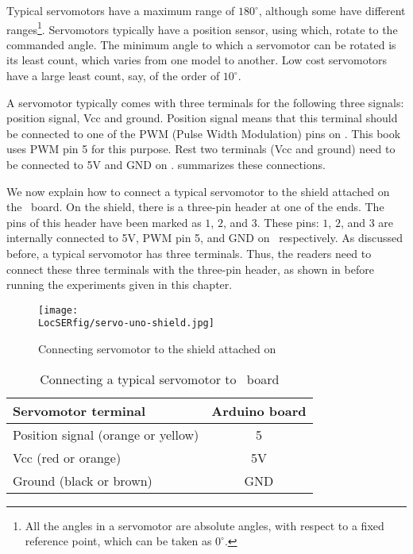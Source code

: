 Typical servomotors have a maximum range of $180^\circ$, although some
have different ranges\footnote{All the angles in a servomotor are
  absolute angles, with respect to a fixed reference point, which can
  be taken as $0^\circ$.}.
Servomotors typically have a position sensor,
using which, rotate to the commanded angle.  The minimum angle to
which a servomotor can be rotated is its least count, which varies
from one model to another.  Low cost servomotors have a large least
count, say, of the order of $10^\circ$.

A servomotor typically comes with three terminals for the
following three signals: position signal, Vcc and ground. 
Position signal means that this terminal should be connected to 
one of the PWM (Pulse Width Modulation) pins \cite{arduino-pwm} on \arduino. 
This book uses PWM pin 5 for this purpose. 
Rest two terminals (Vcc and ground) need to be connected to 5V and GND on \arduino. 
 summarizes these connections. 

We now explain how to connect a typical servomotor to the shield attached 
on the \arduino\ board. On the shield, there is a three-pin header at one of the 
ends. The pins of this header have been marked as $1$, $2$, and $3$. These pins:
$1$, $2$, and $3$ are internally connected to 5V, PWM pin 5, and GND on \arduino\, respectively.  
As discussed before, a typical servomotor has three terminals. Thus, the readers need to 
connect these three terminals with the three-pin header, as shown in 
before running the experiments given in this chapter. 

\begin{figure}
  \centering
  \texttt{[image: \\LocSERfig/servo-uno-shield.jpg]}
  \caption{Connecting servomotor to the shield attached on \arduino}
  \label{fig:servo-shield}
\end{figure}


\begin{table}
  \centering
  \caption{Connecting a typical servomotor to \arduino\ board}
  \label{tab:servo-connect}
  \begin{tabular}{lc}\hline
    Servomotor terminal                & Arduino board \\ \hline
    Position signal (orange or yellow) & 5             \\
    Vcc (red or orange)                & 5V            \\
    Ground (black or brown)            & GND           \\ 
    \hline
  \end{tabular}
\end{table}


